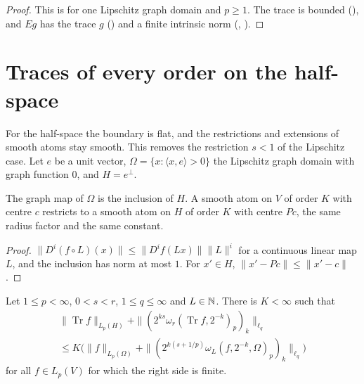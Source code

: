 \begin{proof}
\leanok
This is \cite[Theorem 4.11]{SchneiderVybiral} for one Lipschitz graph domain and $p \geq 1$. The
trace is bounded (), and $E g$ has the trace $g$
() and a finite intrinsic norm (,
).
\end{proof}

\section{Traces of every order on the half-space}
\label{sec:half-space-traces}

For the half-space the boundary is flat, and the restrictions and extensions of smooth atoms stay
smooth. This removes the restriction $s < 1$ of the Lipschitz case. Let $e$ be a unit vector,
$\Omega = \{x : \langle x, e \rangle > 0\}$ the Lipschitz graph domain with graph function $0$,
and $H = e^\perp$.

\begin{lemma}
\label{lem:smooth-atoms-hyperplane}
\leanok
{}
The graph map of $\Omega$ is the inclusion of $H$. A smooth atom on $V$ of order $K$ with centre
$c$ restricts to a smooth atom on $H$ of order $K$ with centre $Pc$, the same radius factor and the
same constant.
\end{lemma}

\begin{proof}
\leanok
$\|D^i (f \circ L)(x)\| \leq \|D^i f(Lx)\| \|L\|^i$ for a continuous linear map $L$, and the
inclusion has norm at most $1$. For $x' \in H$, $\|x' - Pc\| \leq \|x' - c\|$.
\end{proof}

\begin{theorem}
\label{thm:trace-every-order}
\leanok
{}
Let $1 \leq p < \infty$, $0 < s < r$, $1 \leq q \leq \infty$ and $L \in \mathbb{N}$. There is
$K < \infty$ such that
\begin{multline*}
  \|\operatorname{Tr} f\|_{L_p(H)} + \|(2^{ks} \omega_r(\operatorname{Tr} f, 2^{-k})_p)_k\|_{\ell_q}
  \\ \leq K \bigl(\|f\|_{L_p(\Omega)} +
    \|(2^{k(s + 1/p)} \omega_L(f, 2^{-k}, \Omega)_p)_k\|_{\ell_q}\bigr)
\end{multline*}
for all $f \in L_p(V)$ for which the right side is finite.
\end{theorem}

